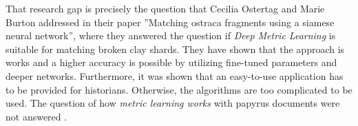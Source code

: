 \noindent That research gap is precisely the question that Cecilia Ostertag and Marie Burton addressed in their paper ''Matching ostraca fragments using a siamese neural network'', where they answered the question if \textit{Deep Metric Learning} is suitable for matching broken clay shards. They have shown that the approach is works and a higher accuracy is possible by utilizing fine-tuned parameters and deeper networks. Furthermore, it was shown that an easy-to-use application has to be provided for historians. Otherwise, the algorithms are too complicated to be used. The question of how \textit{metric learning works} with papyrus documents were not answered \cite{Ostertag21}.\\

\begin{table}[]
\end{table}
